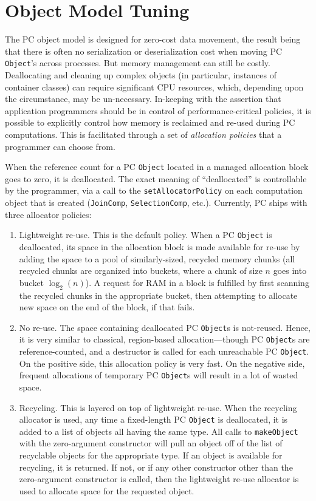 \section{Object Model Tuning}

\noindent
The PC object model is designed for zero-cost data movement, the result being that there is often no serialization or deserialization
cost
when moving PC \texttt{Object}'s across processes.  But memory management can still be costly.  Deallocating and cleaning
up complex objects (in particular, instances of container classes) can require significant CPU resources, which, depending upon the 
circumstance, may be un-necessary.  In-keeping with the assertion that application programmers should be in
control of performance-critical policies, it is possible to explicitly control how memory is reclaimed and re-used during PC computations.
This is facilitated through a set of \emph{allocation policies} that a programmer can choose from.

When the reference count for a PC \texttt{Object} located in a managed allocation block goes to zero, it is deallocated.  The exact
meaning of ``deallocated'' is controllable by the programmer, via a call to the \texttt{setAllocatorPolicy} on each computation object
that is created (\texttt{JoinComp}, \texttt{SelectionComp}, etc.).  Currently, PC ships with
three allocator policies:

\begin{enumerate}

\item Lightweight re-use.  This is the default policy.  When a PC \texttt{Object} is deallocated, its space in the allocation block is made available for re-use by
adding the space to a pool of similarly-sized, recycled memory chunks (all recycled chunks are organized into buckets, where a chunk of size
$n$ goes into bucket $\log_2 (n)$).  A request for RAM in a block is fulfilled by first scanning the recycled chunks in the appropriate bucket, then
attempting to allocate new space on the end of the block, if that fails.
\item No re-use.  The space containing deallocated PC \texttt{Object}s is not-reused.  Hence, it is very similar to classical, region-based allocation---though PC \texttt{Object}s
are reference-counted, and a destructor is called for each unreachable PC \texttt{Object}.
On the positive side, this allocation policy is very fast.  On the negative side, frequent allocations of temporary PC \texttt{Object}s will result in a lot of wasted space.
\item Recycling.  This is layered on top of lightweight re-use.  When the recycling allocator is used, any time a fixed-length
PC \texttt{Object} is deallocated, it is
added to a list of objects all having the same type.  All calls to \texttt{makeObject} with the zero-argument constructor will
pull an object off of the list of recyclable objects for the appropriate type.  
If an object is available for recycling, it is returned.  If not, or if any other constructor other than the zero-argument constructor is called, 
then the lightweight re-use allocator is used to allocate space for the requested
object.

\end{enumerate}

